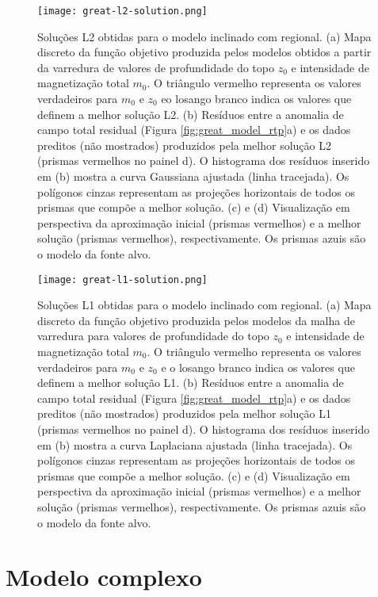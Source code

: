 \pagebreak

\begin{figure}[!htb]
	\centering
	\texttt{[image: great-l2-solution.png]}
	\caption{Soluções L2 obtidas para o modelo inclinado com regional. 
		(a) Mapa discreto da função objetivo produzida pelos modelos obtidos a partir da varredura de valores de profundidade do topo $z_{0}$ e intensidade de magnetização total $m_{0}$. 
		O triângulo vermelho representa os valores verdadeiros para $m_{0}$ e $z_{0}$ eo losango branco indica os valores que definem a melhor solução L2.
		(b) Resíduos entre a anomalia de campo total residual (Figura \ref{fig:great_model_rtp}a) 
		e os dados preditos (não mostrados) produzidos pela melhor solução L2 (prismas vermelhos no painel d). 
		O histograma dos resíduos inserido em (b) mostra a curva Gaussiana ajustada (linha tracejada).
		Os polígonos cinzas representam as projeções horizontais de todos os prismas que compõe a melhor solução. 
		(c) e (d) Visualização em perspectiva da aproximação inicial (prismas vermelhos) e 
		a melhor solução (prismas vermelhos), respectivamente. Os prismas azuis são o modelo da fonte alvo. 
	}
	\label{fig:great_l2_result}
\end{figure}
\pagebreak
\begin{figure}[!htb]
	\centering
	\texttt{[image: great-l1-solution.png]}
	\caption{Soluções L1 obtidas para o modelo inclinado com regional. 
		(a) Mapa discreto da função objetivo produzida pelos modelos da malha de varredura para valores de profundidade do topo $z_{0}$ e intensidade de magnetização total $m_{0}$. 
		O triângulo vermelho representa os valores verdadeiros para $m_{0}$ e $z_{0}$ e o losango branco indica os valores que definem a melhor solução L1.
		(b) Resíduos entre a anomalia de campo total residual (Figura \ref{fig:great_model_rtp}a) 
		e os dados preditos (não mostrados) produzidos pela melhor solução L1 (prismas vermelhos no painel d). 
		O histograma dos resíduos inserido em (b) mostra a curva Laplaciana ajustada (linha tracejada).
		Os polígonos cinzas representam as projeções horizontais de todos os prismas que compõe a melhor solução. 
		(c) e (d) Visualização em perspectiva da aproximação inicial (prismas vermelhos) e 
		a melhor solução (prismas vermelhos), respectivamente. Os prismas azuis são o modelo da fonte alvo. 
	}
	\label{fig:great_l1_result}
\end{figure}
\pagebreak


\section{Modelo complexo}
\label{sec:target_source_without_interference}

